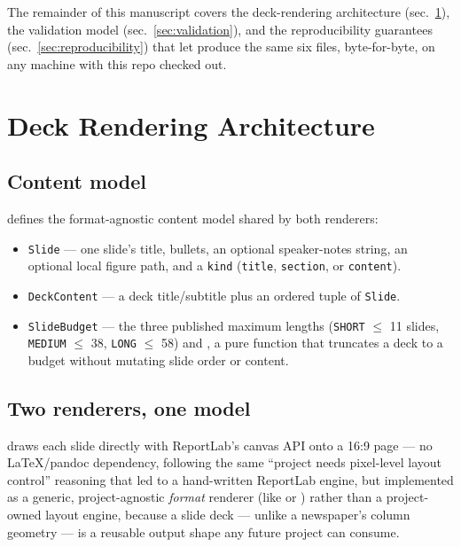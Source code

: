 \documentclass[
  english,
]{article}
\providecommand{\tightlist}{%
  \setlength{\itemsep}{0pt}\setlength{\parskip}{0pt}}
\begin{document}
The remainder of this manuscript covers the deck-rendering architecture
(sec.~\ref{sec:architecture}), the validation model
(sec.~\ref{sec:validation}), and the reproducibility guarantees
(sec.~\ref{sec:reproducibility}) that let
produce the same six files, byte-for-byte, on any machine with this repo
checked out.

\newpage

\section{Deck Rendering Architecture}\label{sec:architecture}

\subsection{Content model}\label{content-model}

 defines the
format-agnostic content model shared by both renderers:

\begin{itemize}
\tightlist
\item
  \texttt{Slide} --- one slide's title, bullets, an optional
  speaker-notes string, an optional local figure path, and a
  \texttt{kind} (\texttt{title}, \texttt{section}, or \texttt{content}).
\item
  \texttt{DeckContent} --- a deck title/subtitle plus an ordered tuple
  of \texttt{Slide}.
\item
  \texttt{SlideBudget} --- the three published maximum lengths
  (\texttt{SHORT} \texorpdfstring{\ensuremath{\leq}}{<=} 11 slides, \texttt{MEDIUM} \texorpdfstring{\ensuremath{\leq}}{<=} 38, \texttt{LONG} \texorpdfstring{\ensuremath{\leq}}{<=} 58)
  and , a pure function that truncates
  a deck to a budget without mutating slide order or content.
\end{itemize}

\subsection{Two renderers, one model}\label{two-renderers-one-model}

 draws each
slide directly with ReportLab's canvas API onto a 16:9 page --- no
LaTeX/pandoc dependency, following the same ``project needs pixel-level
layout control'' reasoning that led  to a
hand-written ReportLab engine, but implemented as a generic,
project-agnostic \emph{format} renderer (like
 or
) rather than a project-owned layout engine,
because a slide deck --- unlike a newspaper's column geometry --- is a
reusable output shape any future project can consume.
\end{document}
